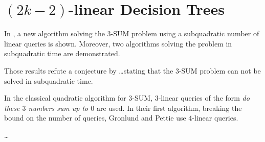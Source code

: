 \section{$(2k-2)$-linear Decision Trees}

In \cite{gronlund:2014}, a new algorithm solving the $3$-SUM problem using a
subquadratic number of linear queries is shown. Moreover, two algorithms
solving the problem in subquadratic time are demonstrated.

Those results refute a conjecture by \dots stating that the $3$-SUM problem can
not be solved in subquadratic time.

In the classical quadratic algorithm for $3$-SUM, $3$-linear queries of the
form \emph{do these $3$ numbers sum up to $0$} are used. In their first
algorithm, breaking the  bound on the number of queries, Gronlund
and Pettie use $4$-linear queries.

\dots

